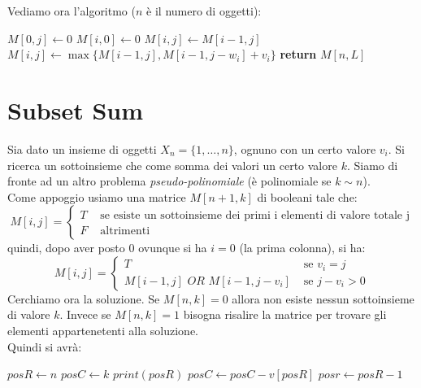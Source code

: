 \documentclass[a4paper,12pt, oneside]{book}
\begin{document}
Vediamo ora l'algoritmo ($n$ è il numero di oggetti):
\begin{algorithm}[H]
  \begin{algorithmic}
    \State $M[0,j]\gets 0$
    \EndFor
    \State $M[i,0]\gets 0$
    \EndFor
    \State $M[i,j]\gets M[i-1,j]$
    \Else
    \State $M[i,j]\gets \max\{M[i-1,j],M[i-1,j-w_i]+v_i\}$
    \EndIf
    \EndFor
    \EndFor
    \State \textbf{return} $M[n,L]$
    \EndFunction
  \end{algorithmic}
\end{algorithm}
\section{Subset Sum}
Sia dato un insieme di oggetti $X_n=\{1,\ldots, n\}$, ognuno con un
certo valore $v_i$. Si ricerca un sottoinsieme che come somma dei
valori un certo valore $k$. Siamo di fronte ad un altro problema
\textit{pseudo-polinomiale} (è polinomiale se $k\sim n$).\\
Come appoggio usiamo una matrice $M[n+1,k]$ di booleani tale che:
\[M[i,j]=
  \begin{cases}
    T & \mbox{ se esiste un sottoinsieme dei primi i elementi di
      valore totale j}\\
    F & \mbox{ altrimenti}
  \end{cases}
\]
quindi, dopo aver posto $0$ ovunque si ha $i=0$ (la prima colonna), si
ha:
\[M[i,j]=
  \begin{cases}
    T & \mbox{ se } v_i=j\\
    M[i-1,j]\,\,OR\,\, M[i-1,j-v_i] & \mbox{ se } j-v_i>0
  \end{cases}
\]
Cerchiamo ora la soluzione. Se $M[n,k]=0$ allora non esiste nessun
sottoinsieme di valore $k$. Invece se $M[n,k]=1$ bisogna risalire la
matrice per trovare gli elementi appartenetenti alla soluzione.\\

Quindi si avrà:
\begin{algorithm}[H]
  \begin{algorithmic}
    \State $posR\gets n$
    \State $posC\gets k$
    \State $print(posR)$
    \State $posC\gets posC - v[posR]$
    \EndIf
    \State $posr \gets posR-1$
    \EndWhile
    \EndFunction
  \end{algorithmic}
\end{algorithm}
\end{document}
